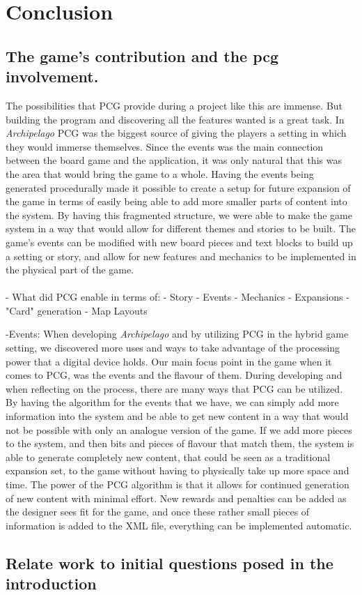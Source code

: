\chapter{Conclusion}
\section{The game's contribution and the pcg involvement. }

The possibilities that PCG provide during a project like this are immense. But building the program and discovering all the features wanted is a great task. In \textit{Archipelago} PCG was the biggest source of giving the players a setting in which they would immerse themselves. Since the events was the main connection between the board game and the application, it was only natural that this was the area that would bring the game to a whole. Having the events being generated procedurally made it possible to create a setup for future expansion of the game in terms of easily being able to add more smaller parts of content into the system. By having this fragmented structure, we were able to make the game system in a way that would allow for different themes and stories to be built. The game's events can be modified with new board pieces and text blocks to build up a setting or story, and allow for new features and mechanics to be implemented in the physical part of the game.\\\\

- What did PCG enable in terms of:
	- Story
	- Events
	- Mechanics
	- Expansions
	- "Card" generation
	- Map Layouts
	
-Events:
When developing \textit{Archipelago} and by utilizing PCG in the hybrid game setting, we discovered more uses and ways to take advantage of the processing power that a digital device holds. Our main focus point in the game when it comes to PCG, was the events and the flavour of them. During developing and when reflecting on the process, there are many ways that PCG can be utilized. By having the algorithm for the events that we have, we can simply add more information into the system and be able to get new content in a way that would not be possible with only an analogue version of the game. If we add more pieces to the system, and then bits and pieces of flavour that match them, the system is able to generate completely new content, that could be seen as a traditional expansion set, to the game without having to physically take up more space and time. The power of the PCG algorithm is that it allows for continued generation of new content with minimal effort. New rewards and penalties can be added as the designer sees fit for the game, and once these rather small pieces of information is added to the XML file, everything can be implemented automatic. 



\section{Relate work to initial questions posed in the introduction}

